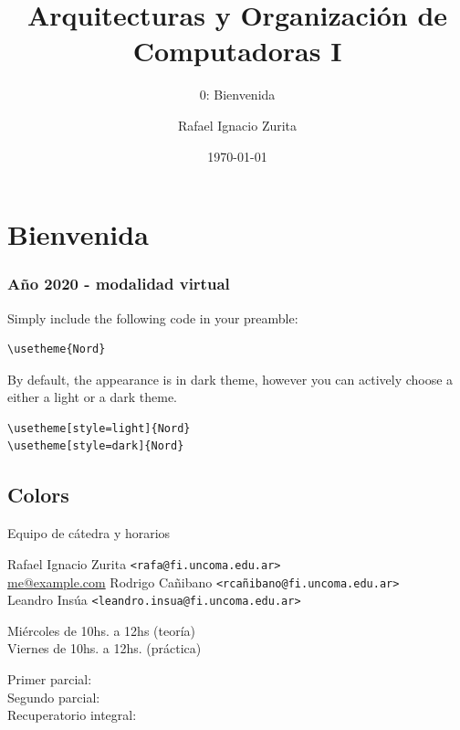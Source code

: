 \documentclass[aspectratio=169,compress]{beamer}
\title{Arquitecturas y Organización de Computadoras I}
\subtitle{0: Bienvenida}
\author{Rafael Ignacio Zurita}
\institute{Depto. Ingeniería de Computadoras}
\date{\today}
\begin{document}
\begin{frame}
  \maketitle
\end{frame}


\section{Bienvenida}


\begin{frame}[fragile]
  \frametitle{Año 2020 - modalidad virtual}
  Simply include the following code in your preamble:

  \begin{lstlisting}[basicstyle = \ttfamily\small]
\usetheme{Nord}
  \end{lstlisting}

  \bigskip

  By default, the appearance is in dark theme, however you can actively choose a either a light or a
  dark theme.

  \begin{lstlisting}[basicstyle = \ttfamily\small]
\usetheme[style=light]{Nord}
\usetheme[style=dark]{Nord}
  \end{lstlisting}

\end{frame}

\subsection{Colors}

\begin{frame}{Equipo de cátedra y horarios}
  \begin{description}
  \item[Docentes]
\begin{small}
    Rafael Ignacio Zurita \texttt{\footnotesize<rafa@fi.uncoma.edu.ar>}\\
\href{mailto:me@example.com}{me@example.com}
    Rodrigo Cañibano \texttt{\footnotesize<rcañibano@fi.uncoma.edu.ar>}\\
    Leandro Insúa \texttt{\footnotesize<leandro.insua@fi.uncoma.edu.ar>}\\
\end{small}
  \item[Horarios]
	Miércoles de 10hs. a 12hs (teoría)\\
	Viernes de 10hs. a 12hs. (práctica)\\
  \item[Exámenes]
	Primer parcial:\\ 
	Segundo parcial:\\
	Recuperatorio integral:
  

  \end{description}
\end{frame}
\end{document}
